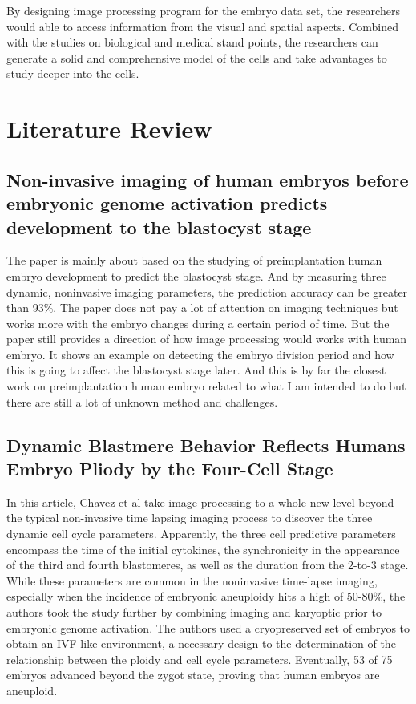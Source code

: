\documentclass[12pt]{article}
\begin{document}
\noindent \qquad By designing image processing program for the embryo data set, the researchers would able to access information from the visual and spatial aspects. Combined with the studies on biological and medical stand points, the researchers can generate a solid and comprehensive model of the cells and take advantages to study deeper into the cells.

\newpage \section{Literature Review}

\subsection{Non-invasive imaging of human embryos before embryonic genome activation predicts development to the blastocyst stage}

\qquad The paper is mainly about based on the studying of preimplantation human embryo development to predict the blastocyst stage. And by measuring three dynamic, noninvasive imaging parameters, the prediction accuracy can be greater than 93\%. The paper does not pay a lot of attention on imaging techniques but works more with the embryo changes during a certain period of time. But the paper still provides a direction of how image processing would works with human embryo. It shows an example on detecting the embryo division period and how this is going to affect the blastocyst stage later. And this is by far the closest work on preimplantation human embryo related to what I am intended to do but there are still a lot of unknown method and challenges.

\subsection{Dynamic Blastmere Behavior Reflects Humans Embryo Pliody by the Four-Cell Stage}

\qquad In this article, Chavez et al take image processing to a whole new level beyond the typical non-invasive time lapsing imaging process to discover the three dynamic cell cycle parameters.  Apparently, the three cell predictive parameters encompass the time of the initial cytokines, the synchronicity in the appearance of the third and fourth blastomeres, as well as the duration from the 2-to-3 stage. While these parameters are common in the noninvasive time-lapse imaging, especially when the incidence of embryonic aneuploidy hits a high of 50-80\%, the authors took the study further by combining imaging and karyoptic prior to embryonic genome activation. The authors used a cryopreserved set of embryos to obtain an IVF-like environment, a necessary design to the determination of the relationship between the ploidy and cell cycle parameters. Eventually, 53 of 75 embryos advanced beyond the zygot state, proving that human embryos are aneuploid. \\
\end{document}
